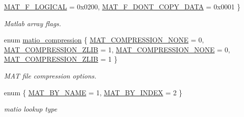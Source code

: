 \begin{DoxyCompactItemize}
\hyperlink{group___m_a_t_ggab9d6ef9e3ddca78a317b173f01d53fbba57eb5c6e200bcbc0f1b7982f29a169c2}{M\+A\+T\+\_\+\+F\+\_\+\+L\+O\+G\+I\+C\+AL} = 0x0200, 
\hyperlink{group___m_a_t_ggab9d6ef9e3ddca78a317b173f01d53fbba762244499f52eb35e7b53fb79a1f2889}{M\+A\+T\+\_\+\+F\+\_\+\+D\+O\+N\+T\+\_\+\+C\+O\+P\+Y\+\_\+\+D\+A\+TA} = 0x0001
 \}\begin{DoxyCompactList}\small\item\em Matlab array flags. \end{DoxyCompactList}
\item 
enum \hyperlink{group___m_a_t_ga768c318af97bd2567758ecb001ceb7f4}{matio\+\_\+compression} \{ \hyperlink{group___m_a_t_gga768c318af97bd2567758ecb001ceb7f4a2280b97631ff5dd24dec55261dc587b6}{M\+A\+T\+\_\+\+C\+O\+M\+P\+R\+E\+S\+S\+I\+O\+N\+\_\+\+N\+O\+NE} = 0, 
\hyperlink{group___m_a_t_gga768c318af97bd2567758ecb001ceb7f4a5181d2f71eab0f12f05ba65d4f13fb53}{M\+A\+T\+\_\+\+C\+O\+M\+P\+R\+E\+S\+S\+I\+O\+N\+\_\+\+Z\+L\+IB} = 1, 
\hyperlink{group___m_a_t_gga768c318af97bd2567758ecb001ceb7f4a2280b97631ff5dd24dec55261dc587b6}{M\+A\+T\+\_\+\+C\+O\+M\+P\+R\+E\+S\+S\+I\+O\+N\+\_\+\+N\+O\+NE} = 0, 
\hyperlink{group___m_a_t_gga768c318af97bd2567758ecb001ceb7f4a5181d2f71eab0f12f05ba65d4f13fb53}{M\+A\+T\+\_\+\+C\+O\+M\+P\+R\+E\+S\+S\+I\+O\+N\+\_\+\+Z\+L\+IB} = 1
 \}\begin{DoxyCompactList}\small\item\em M\+AT file compression options. \end{DoxyCompactList}
\item 
enum \{ \hyperlink{group___m_a_t_ggaf008e9f8e283700d05e218ea8a3bb2caa26c82f22528c705191141491a072db3e}{M\+A\+T\+\_\+\+B\+Y\+\_\+\+N\+A\+ME} = 1, 
\hyperlink{group___m_a_t_ggaf008e9f8e283700d05e218ea8a3bb2caa69c57994e272a363f56cb3ba888b047e}{M\+A\+T\+\_\+\+B\+Y\+\_\+\+I\+N\+D\+EX} = 2
 \}\begin{DoxyCompactList}\small\item\em matio lookup type \end{DoxyCompactList}
\end{DoxyCompactItemize}
